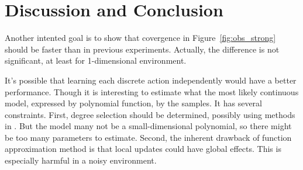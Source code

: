 \documentclass[10pt]{IEEEtran}
\begin{document}
\section{Discussion and Conclusion}
\label{sec:dis}

Another intented goal is to show that covergence in
Figure~\ref{fig:obs_strong} should be faster than in previous
experiments. Actually, the difference is not significant, at least for
1-dimensional environment.

It's possible that learning each discrete action independently would
have a better performance. Though it is interesting to estimate what
the most likely continuous model, expressed by polynomial function, by
the samples. It has several constraints. First, degree selection
should be determined, possibly using methods in
\cite{IJAIT08-stronger}. But the model many not be a small-dimensional
polynomial, so there might be too many parameters to estimate. Second,
the inherent drawback of function approximation method is that local
updates could have global effects. This is especially harmful in a
noisy environment.




\end{document}
